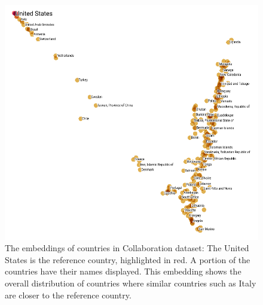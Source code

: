 \documentclass[11pt,twocolumn]{article}
\begin{document}
\begin{figure}[!ht]\centering
	\includegraphics[width=\textwidth]{countries}
	\caption{
		The embeddings of countries in Collaboration dataset:
		The United States is the reference country, highlighted in red.
		A portion of the countries have their names displayed.
		This embedding shows the overall distribution of countries where similar countries such as Italy are closer to the reference country.
	}
	\label{fig:countries}
\end{figure}
\end{document}
